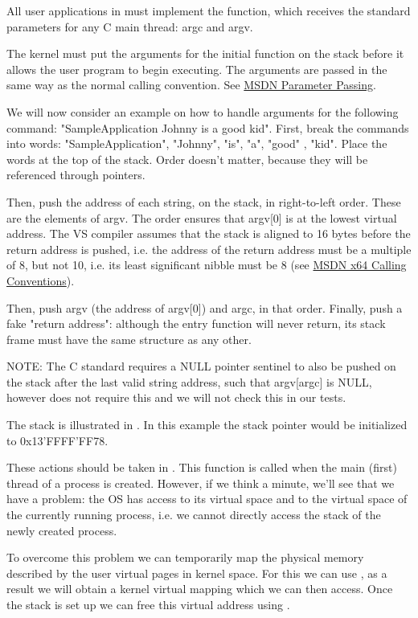 \begin{appendices}
All user applications in \projectname must implement the  function, which receives the
standard parameters for any C main thread: argc and argv.

The kernel must put the arguments for the initial function on the stack before it allows the user
program to begin executing. The arguments are passed in the same way as the normal calling
convention. See \href{https://msdn.microsoft.com/en-us/library/zthk2dkh.aspx}{MSDN Parameter Passing}.

We will now consider an example on how to handle arguments for the following command:
"SampleApplication Johnny is a good kid". First, break the commands into words: "SampleApplication",
"Johnny", "is", "a", "good" , "kid". Place the words at the top of the stack. Order doesn't matter,
because they will be referenced through pointers.

Then, push the address of each string, on the stack, in right-to-left order. These are the elements
of argv. The order ensures that argv[0] is at the lowest virtual address. The VS compiler assumes
that the stack is aligned to 16 bytes before the return address is pushed, i.e. the address of the
return address must be a multiple of 8, but not 10, i.e. its least significant nibble must be 8
(see \href{https://msdn.microsoft.com/en-us/library/ms235286.aspx}{MSDN x64 Calling Conventions}).

Then, push argv (the address of argv[0]) and argc, in that order. Finally, push a fake "return
address": although the entry function will never return, its stack frame must have the same
structure as any other.

NOTE: The C standard requires a NULL pointer sentinel to also be pushed on the stack after the last
valid string address, such that argv[argc] is NULL, however \projectname does not require this and
we will not check this in our tests.

The stack is illustrated in . In this example the stack pointer would be
initialized to 0x13'FFFF'FF78.

These actions should be taken in . This function is called
when the main (first) thread of a process is created. However, if we think a minute, we'll see that
we have a problem: the OS has access to its virtual space and to the virtual space of the currently
running process, i.e. we cannot directly access the stack of the newly created process.

To overcome this problem we can temporarily map the physical memory described by the user virtual
pages in kernel space. For this we can use , as a
result we will obtain a kernel virtual mapping which we can then access. Once the stack is set up
we can free this virtual address using .


\end{appendices}
